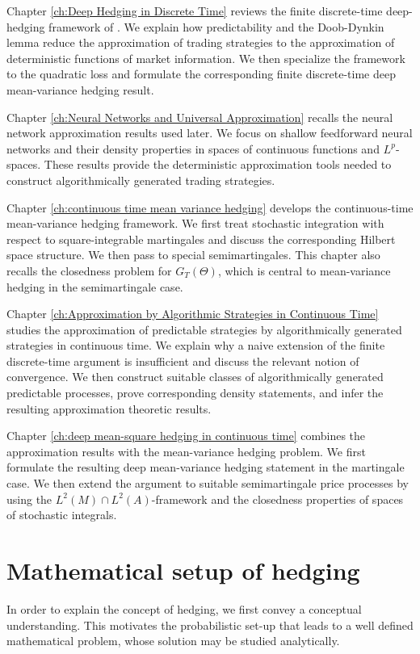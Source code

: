 \documentclass[11pt,a4paper,twoside,openany]{report}
\numberwithin{equation}{section}
\theoremstyle{plain} %
\theoremstyle{definition} %
\theoremstyle{remark} %
\let\parencite\authnumparencite
\begin{document}
Chapter \ref{ch:Deep Hedging in Discrete Time} reviews the finite discrete-time deep-hedging
framework of \parencite{Buehler2018DeepHedging}. We explain how predictability and the Doob-Dynkin lemma
reduce the approximation of trading strategies to the approximation of deterministic
functions of market information. We then specialize the framework to the quadratic loss
and formulate the corresponding finite discrete-time deep mean-variance hedging result.

Chapter \ref{ch:Neural Networks and Universal Approximation} recalls the neural network approximation results used
later. We focus on shallow feedforward neural networks and their density properties in
spaces of continuous functions and \(L^p\)-spaces. These results provide the deterministic
approximation tools needed to construct algorithmically generated trading strategies.

Chapter \ref{ch:continuous time mean variance hedging} develops the continuous-time
mean-variance hedging framework. We first treat stochastic integration with respect to
square-integrable martingales and discuss the corresponding Hilbert space structure. We then
pass to special semimartingales. This chapter also recalls the closedness problem for
\(G_T(\Theta)\), which is central to mean-variance hedging in the semimartingale case.

Chapter \ref{ch:Approximation by Algorithmic Strategies in Continuous Time} studies the approximation of
predictable strategies by algorithmically generated strategies in continuous time. We explain
why a naive extension of the finite discrete-time argument is insufficient and discuss the relevant notion of convergence. We then construct suitable
classes of algorithmically generated predictable processes, prove corresponding density statements, and infer the resulting approximation theoretic results. 

Chapter \ref{ch:deep mean-square hedging in continuous time} combines the approximation
results with the mean-variance hedging problem. We first formulate the resulting deep
mean-variance hedging statement in the martingale case. We then extend the argument to
suitable semimartingale price processes by using the \(L^2(M)\cap L^2(A)\)-framework and
the closedness properties of spaces of stochastic integrals.





\chapter{Mathematical setup of hedging}\label{ch:hedging}
In order to explain the concept of hedging, we first convey a conceptual understanding. This motivates the probabilistic set-up that leads to a well defined mathematical problem, whose solution may be studied analytically.
\end{document}
